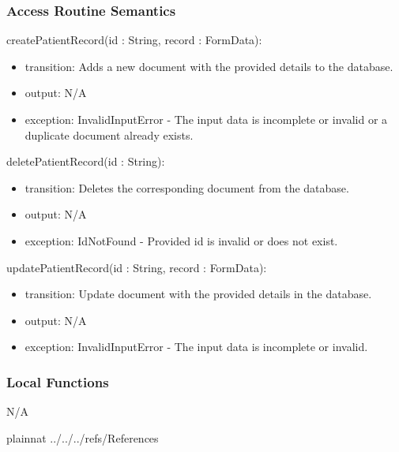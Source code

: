 \documentclass[12pt, titlepage]{article}
\begin{document}
\subsubsection{Access Routine Semantics}

\noindent createPatientRecord(id : String, record : FormData):
\begin{itemize}
\item transition: Adds a new document with the provided details to the database.
\item output: N/A
\item exception: InvalidInputError - The input data is incomplete or invalid or a duplicate document already exists.
\end{itemize}

\noindent deletePatientRecord(id : String):
\begin{itemize}
\item transition: Deletes the corresponding document from the database.
\item output: N/A
\item exception: IdNotFound - Provided id is invalid or does not exist.
\end{itemize}

\noindent updatePatientRecord(id : String, record : FormData):
\begin{itemize}
\item transition: Update document with the provided details in the database.
\item output: N/A
\item exception: InvalidInputError - The input data is incomplete or invalid.
\end{itemize}

\subsubsection{Local Functions}

N/A

\newpage


 {plainnat}
 {../../../refs/References}




\newpage{}
\end{document}
